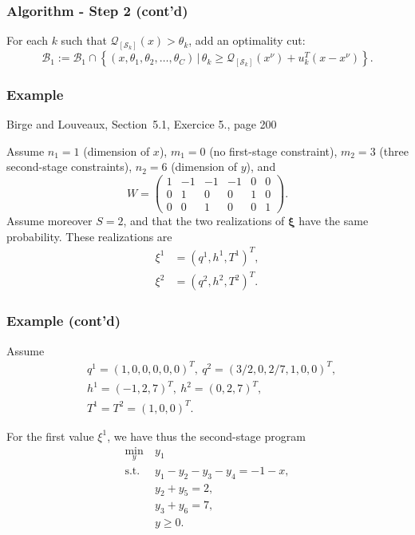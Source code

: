 \documentclass{beamer}
\def\bxi{\boldsymbol\xi}
\def\bxi{\boldsymbol\xi}
\begin{document}
\begin{frame}
\frametitle{Algorithm - Step 2 (cont'd)}

For each $k$ such that  $\mathcal{Q}_{[\mathcal{S}_k]}(x) >
\theta_k$, add an optimality cut:
\[
\mathcal{B}_1 := \mathcal{B}_1 \cap \left\lbrace (x, \theta_1,
\theta_2,\ldots, \theta_C) \,|\, \theta_k \geq
\mathcal{Q}_{[\mathcal{S}_k]}(x^{\nu}) + u_k^T(x-x^{\nu}) \right\rbrace.
\]



\end{frame}

\begin{frame}
\frametitle{Example}

{\red Birge and Louveaux, Section~5.1, Exercice 5., page 200}

\mbox{}

Assume $n_1 = 1$ (dimension of $x$), $m_1 = 0$ (no first-stage constraint), $m_2 = 3$ (three second-stage constraints), $n_2 = 6$ (dimension of $y$), and
\[
W = \begin{pmatrix}
1 & -1 & -1 & -1 & 0 & 0 \\
0 & 1 & 0 & 0 & 1 & 0 \\
0 & 0 & 1 & 0 & 0 & 1
\end{pmatrix}.
\]
Assume moreover $S = 2$, and that the two realizations of $\bxi$ have the same probability.
These realizations are
\begin{align*}
\xi^1 &= (q^1, h^1, T^1)^T, \\
\xi^2 &= (q^2, h^2, T^2)^T.
\end{align*}

\end{frame}

\begin{frame}
\frametitle{Example (cont'd)}

Assume
\begin{align*}
& q^1 = (1,0,0,0,0,0)^T,\ q^2 = (3/2, 0, 2/7, 1, 0, 0)^T, \\
& h^1 = (-1,2,7)^T,\ h^2 = (0,2,7)^T, \\
& T^1 = T^2 = (1,0,0)^T.
\end{align*}

\mbox{}

For the first value $\xi^1$, we have thus the second-stage program
\begin{align*}
\min_y\ & y_1 \\
\mbox{s.t. } & y_1 - y_2 - y_3 -y_4 = -1 - x, \\
& y_2 + y_5 = 2, \\
& y_3 + y_6 = 7, \\
& y \geq 0.
\end{align*}

\end{frame}
\end{document}
